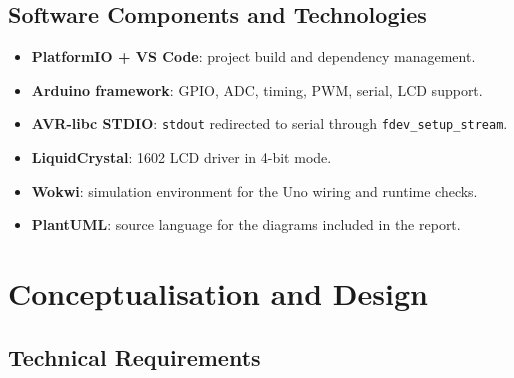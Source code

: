 \documentclass[12pt]{article}
\begin{document}
\subsection{Software Components and Technologies}

\begin{itemize}
    \item \textbf{PlatformIO + VS Code}: project build and dependency management.
    \item \textbf{Arduino framework}: GPIO, ADC, timing, PWM, serial, LCD support.
    \item \textbf{AVR-libc STDIO}: \texttt{stdout} redirected to serial through \texttt{fdev\_setup\_stream}.
    \item \textbf{LiquidCrystal}: 1602 LCD driver in 4-bit mode.
    \item \textbf{Wokwi}: simulation environment for the Uno wiring and runtime checks.
    \item \textbf{PlantUML}: source language for the diagrams included in the report.
\end{itemize}

\section{Conceptualisation and Design}

\subsection{Technical Requirements}
\end{document}
